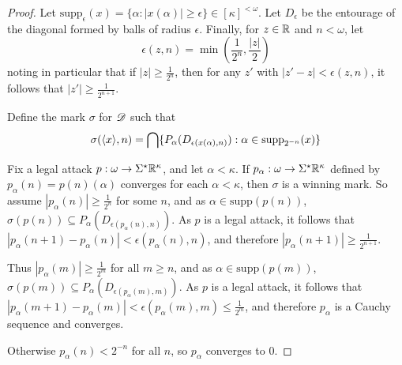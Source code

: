 \documentclass[11pt]{article}
\begin{document}
  \begin{proof}
    Let
    $
      \text{supp}_\epsilon(x)
        =
      \{\alpha:|x(\alpha)|\geq \epsilon\}
        \in
      [\kappa]^{<\omega}
    $. Let $D_\epsilon$ be the entourage of the diagonal formed by
    balls of radius $\epsilon$. Finally, for $z\in\mathbb{R}$
    and $n<\omega$, let
      \[
        \epsilon(z,n)
          =
        \min\left(
          \frac{1}{2^n},
          \frac{|z|}{2}
        \right)
      \]
    noting in particular that if $|z|\geq\frac{1}{2^n}$, then for any $z'$ with
    $|z'-z|<\epsilon(z,n)$, it follows that $|z'|\geq\frac{1}{2^{n+1}}$.

    Define the mark $\sigma$ for $\mathscr{D}$ such that
      \[
        \sigma(\langle x\rangle,n)
          =
        \bigcap\{
          P_\alpha(D_{\epsilon(x(\alpha),n)})
        :
          \alpha\in\text{supp}_{2^{-n}}(x)
        \}
      \]

    Fix a legal attack $p:\omega\to\Sigma^\star\mathbb{R}^{\kappa}$, and let
    $\alpha<\kappa$. If $p_\alpha:\omega\to\Sigma^\star\mathbb{R}^{\kappa}$ defined by
    $p_\alpha(n)=p(n)(\alpha)$ converges for each $\alpha<\kappa$,
    then $\sigma$ is a winning mark. So assume
    $|p_\alpha(n)|\geq\frac{1}{2^n}$ for some $n$,
    and as $\alpha\in\text{supp}(p(n))$,
    $\sigma(p(n))\subseteq P_\alpha(D_{\epsilon(p_\alpha(n),n)})$.
    As $p$ is a legal attack, it follows that
    $|p_\alpha(n+1)-p_\alpha(n)|<\epsilon(p_\alpha(n),n)$, and
    therefore $|p_\alpha(n+1)|\geq\frac{1}{2^{n+1}}$.

    Thus $|p_\alpha(m)|\geq\frac{1}{2^{m}}$ for all $m\geq n$,
    and as $\alpha\in\text{supp}(p(m))$,
    $\sigma(p(m))\subseteq P_\alpha(D_{\epsilon(p_\alpha(m),m)})$.
    As $p$ is a legal attack, it follows that
    $|p_\alpha(m+1)-p_\alpha(m)|<\epsilon(p_\alpha(m),m)\leq \frac{1}{2^m}$,
    and therefore $p_\alpha$ is a Cauchy sequence and converges.

    Otherwise $p_\alpha(n)<2^{-n}$ for all $n$, so $p_\alpha$ converges to $0$.
  \end{proof}


\end{document}
